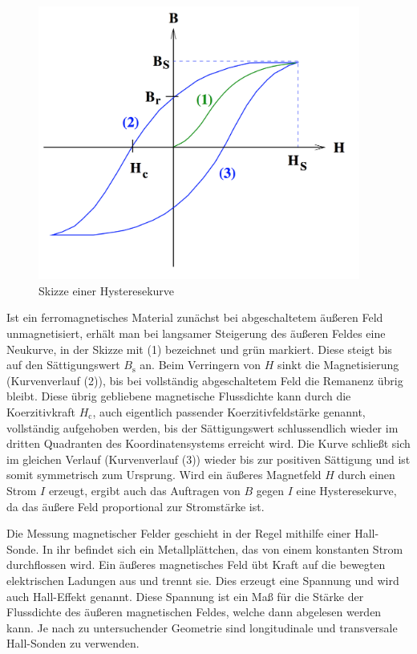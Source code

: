 \begin{figure}
  \centering
  \includegraphics[width=300pt]{data/hysterese.png}
  \caption{Skizze einer Hysteresekurve \cite{Versuchsanleitung}}
  \label{fig:hysteresetheorie}
\end{figure}

Ist ein ferromagnetisches Material zunächst bei abgeschaltetem äußeren Feld unmagnetisiert,
erhält man bei langsamer Steigerung des äußeren Feldes eine Neukurve, in der Skizze
mit (1) bezeichnet und grün markiert.
Diese steigt bis auf den Sättigungswert $B_\text{s}$ an. Beim Verringern von $H$
sinkt die Magnetisierung (Kurvenverlauf (2)), bis bei vollständig abgeschaltetem Feld die Remanenz übrig
bleibt. Diese übrig gebliebene magnetische Flussdichte kann durch die Koerzitivkraft
$H_\text{c}$, auch eigentlich passender Koerzitivfeldstärke genannt, vollständig aufgehoben werden, bis der Sättigungswert schlussendlich wieder
im dritten Quadranten des Koordinatensystems erreicht wird. Die Kurve schließt sich
im gleichen Verlauf (Kurvenverlauf (3)) wieder bis zur positiven Sättigung und ist somit symmetrisch zum Ursprung.
Wird ein äußeres Magnetfeld $H$ durch einen Strom $I$ erzeugt, ergibt auch das Auftragen
von $B$ gegen $I$ eine Hysteresekurve, da das äußere Feld proportional zur Stromstärke ist.

Die Messung magnetischer Felder geschieht in der Regel mithilfe einer Hall-Sonde.
In ihr befindet sich ein Metallplättchen, das von einem konstanten Strom durchflossen wird.
Ein äußeres magnetisches Feld übt Kraft auf die bewegten elektrischen Ladungen aus
und trennt sie. Dies erzeugt eine Spannung und wird auch Hall-Effekt genannt.
Diese Spannung ist ein Maß für die Stärke der Flussdichte des äußeren magnetischen Feldes, welche
dann abgelesen werden kann. Je nach zu untersuchender Geometrie sind longitudinale und transversale Hall-Sonden
zu verwenden.
